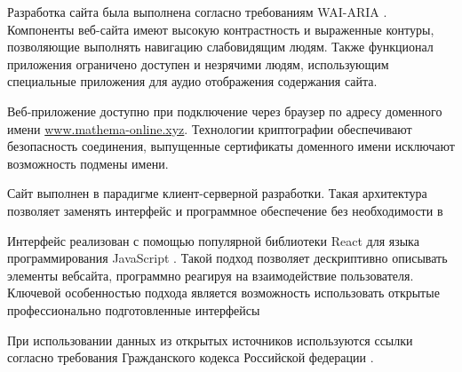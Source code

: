 Разработка сайта была выполнена согласно требованиям WAI-ARIA \cite{craig2009accessible}.
Компоненты веб-сайта имеют высокую контрастность и выраженные контуры, позволяющие выполнять навигацию слабовидящим людям. 
Также функционал приложения ограничено доступен и незрячими людям, использующим специальные приложения для аудио отображения
содержания сайта.

Веб-приложение доступно при подключение через браузер по адресу доменного имени \url{www.mathema-online.xyz}. 
Технологии криптографии обеспечивают безопасность соединения, выпущенные сертификаты доменного имени 
исключают возможность подмены имени.

Сайт выполнен в парадигме клиент-серверной разработки. Такая архитектура
позволяет заменять интерфейс и программное обеспечение без необходимости в 

Интерфейс реализован с помощью популярной библиотеки React для языка программирования JavaScript \cite{ackenheimer2015introduction}.
Такой подход позволяет дескриптивно описывать элементы вебсайта, программно реагируя на взаимодействие пользователя. 
Ключевой особенностью подхода является возможность использовать открытые профессионально подготовленные интерфейсы 

При использовании данных из открытых источников используются ссылки согласно требования Гражданского кодекса
Российской федерации \cite{law1274} \cite{law1260}.
